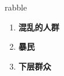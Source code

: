 
\begin{frame}
{\huge rabble}
\begin{center}
\begin{enumerate}\Large
  \item \textbf{混乱的人群}
  \item \textbf{暴民}
  \item \textbf{下层群众}
\end{enumerate}
\end{center}
\end{frame}
